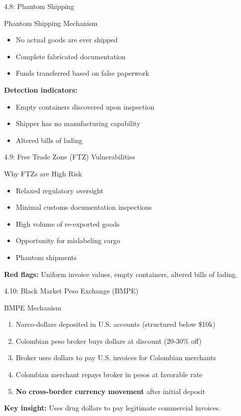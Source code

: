 \documentclass{beamer}
\begin{document}
	\begin{frame}{4.8: Phantom Shipping}
		\begin{block}{Phantom Shipping Mechanism}
			\begin{itemize}
				\item No actual goods are ever shipped
				\item Complete fabricated documentation
				\item Funds transferred based on false paperwork
			\end{itemize}
		\end{block}
		\textbf{Detection indicators:}
		\begin{itemize}
			\item Empty containers discovered upon inspection
			\item Shipper has no manufacturing capability
			\item Altered bills of lading
		\end{itemize}
	\end{frame}
	
	\begin{frame}{4.9: Free Trade Zone (FTZ) Vulnerabilities}
		\begin{block}{Why FTZs are High Risk}
			\begin{itemize}
				\item Relaxed regulatory oversight
				\item Minimal customs documentation inspections
				\item High volume of re-exported goods
				\item Opportunity for mislabeling cargo
				\item Phantom shipments
			\end{itemize}
		\end{block}
		\textbf{Red flags:} Uniform invoice values, empty containers, altered bills of lading.
	\end{frame}
	
	\begin{frame}{4.10: Black Market Peso Exchange (BMPE)}
		\begin{block}{BMPE Mechanism}
			\begin{enumerate}
				\item Narco-dollars deposited in U.S. accounts (structured below \$10k)
				\item Colombian peso broker buys dollars at discount (20-30\% off)
				\item Broker uses dollars to pay U.S. invoices for Colombian merchants
				\item Colombian merchant repays broker in pesos at favorable rate
				\item \textbf{No cross-border currency movement} after initial deposit
			\end{enumerate}
		\end{block}
		\textbf{Key insight:} Uses drug dollars to pay legitimate commercial invoices.
	\end{frame}
	
\end{document}
